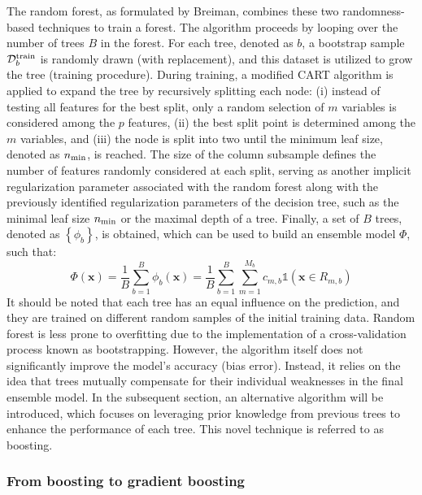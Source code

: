 \documentclass[main]{subfiles}
\begin{document}
The random forest, as formulated by Breiman, combines these two randomness-based techniques to train a forest.\autocite{Breiman_2001} The algorithm proceeds by looping over the number of trees $B$ in the forest. For each tree, denoted as $b$, a bootstrap sample $\mathcal{D}^{\text{train}}_b$ is randomly drawn (with replacement), and this dataset is utilized to grow the tree (training procedure). During training, a modified CART algorithm is applied to expand the tree by recursively splitting each node: (i) instead of testing all features for the best split, only a random selection of $m$ variables is considered among the $p$ features, (ii) the best split point is determined among the $m$ variables, and (iii) the node is split into two until the minimum leaf size, denoted as $n_{\text{min}}$, is reached. The size of the column subsample defines the number of features randomly considered at each split, serving as another implicit regularization parameter associated with the random forest along with the previously identified regularization parameters of the decision tree, such as the minimal leaf size $n_{\text{min}}$ or the maximal depth of a tree. Finally, a set of $B$ trees, denoted as $\left\{\phi_b\right\}$, is obtained, which can be used to build an ensemble model $\Phi$, such that:
\begin{equation}
  \Phi(\mathbf{x}) = \frac{1}{B}\sum_{b=1}^{B} \phi_b(\mathbf{x}) = \frac{1}{B}\sum_{b=1}^{B}\sum_{m=1}^{M_b} c_{m,b} \mathbb{1}(\mathbf{x}\in R_{m,b})
\end{equation}
It should be noted that each tree has an equal influence on the prediction, and they are trained on different random samples of the initial training data. Random forest is less prone to overfitting due to the implementation of a cross-validation process known as bootstrapping. However, the algorithm itself does not significantly improve the model's accuracy (bias error). Instead, it relies on the idea that trees mutually compensate for their individual weaknesses in the final ensemble model. In the subsequent section, an alternative algorithm will be introduced, which focuses on leveraging prior knowledge from previous trees to enhance the performance of each tree. This novel technique is referred to as boosting.

\subsubsection{From boosting to gradient boosting}\label{sct:boosting}
\end{document}
